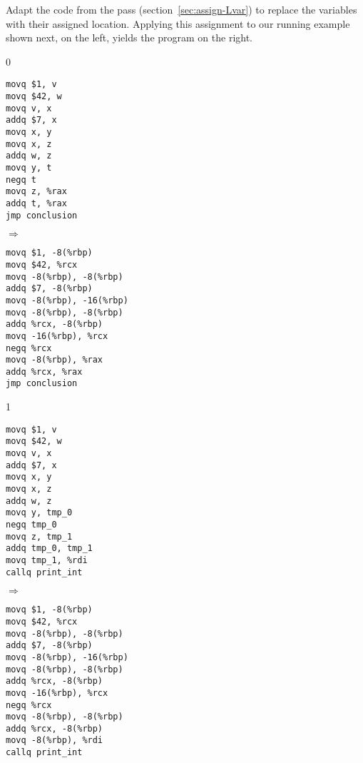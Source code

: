 \documentclass[7x10]{TimesAPriori_MIT}%
\def\racketEd{0}
\def\pythonEd{1}
\def\edition{1}
\newcommand{\pythonColor}[0]{}
\numberwithin{theorem}{chapter}
\numberwithin{definition}{chapter}
\numberwithin{equation}{chapter}
\begin{document}
Adapt the code from the  pass
(section~\ref{sec:assign-Lvar}) to replace the variables with their
assigned location. Applying this assignment to our running
example shown next, on the left, yields the program on the right.
\begin{center}
{\if\edition\racketEd      
\begin{minipage}{0.35\textwidth}
\begin{lstlisting}
movq $1, v
movq $42, w
movq v, x
addq $7, x
movq x, y
movq x, z
addq w, z
movq y, t
negq t
movq z, %rax
addq t, %rax
jmp conclusion
\end{lstlisting}
\end{minipage}
$\Rightarrow\qquad$
\begin{minipage}{0.45\textwidth}
\begin{lstlisting}
movq $1, -8(%rbp)
movq $42, %rcx
movq -8(%rbp), -8(%rbp)
addq $7, -8(%rbp)
movq -8(%rbp), -16(%rbp)
movq -8(%rbp), -8(%rbp)
addq %rcx, -8(%rbp)
movq -16(%rbp), %rcx
negq %rcx
movq -8(%rbp), %rax
addq %rcx, %rax
jmp conclusion
\end{lstlisting}
\end{minipage}
\fi}
{\if\edition\pythonEd\pythonColor
\begin{minipage}{0.35\textwidth}
\begin{lstlisting}
movq $1, v
movq $42, w
movq v, x
addq $7, x
movq x, y
movq x, z
addq w, z
movq y, tmp_0
negq tmp_0
movq z, tmp_1
addq tmp_0, tmp_1
movq tmp_1, %rdi
callq print_int
\end{lstlisting}
\end{minipage}
$\Rightarrow\qquad$
\begin{minipage}{0.45\textwidth}
\begin{lstlisting}
movq $1, -8(%rbp)
movq $42, %rcx
movq -8(%rbp), -8(%rbp)
addq $7, -8(%rbp)
movq -8(%rbp), -16(%rbp)
movq -8(%rbp), -8(%rbp)
addq %rcx, -8(%rbp)
movq -16(%rbp), %rcx
negq %rcx
movq -8(%rbp), -8(%rbp)
addq %rcx, -8(%rbp)
movq -8(%rbp), %rdi
callq print_int    
\end{lstlisting}
\end{minipage}
\fi}
\end{center}
\end{document}
